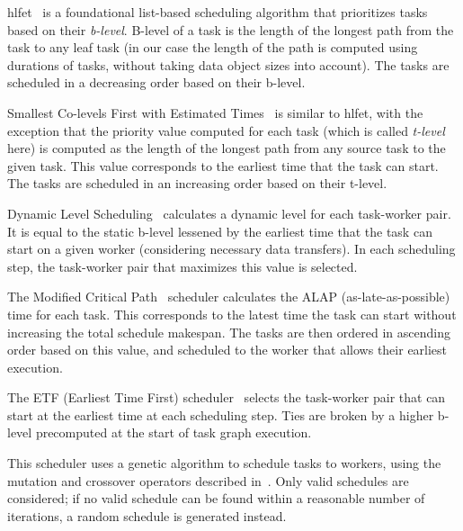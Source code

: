 \begin{description}[wide=0pt,itemsep=0pt,topsep=4pt]
	\item[blevel] \gls{hlfet}~\cite{hlfet1974} is a
		foundational list-based scheduling algorithm that prioritizes tasks based on their
		\emph{b-level}. B-level of a task is the length of the longest path from the task to any
		leaf task (in our case the length of the path is computed using durations of tasks, without taking
		data object sizes into account). The tasks are scheduled in a decreasing order based on their
		b-level.

	\item[tlevel]
		Smallest Co-levels First with Estimated Times~\cite{kwok1999static} is similar to
		\gls{hlfet}, with the exception that the priority value computed for each task (which is
		called \emph{t-level} here) is computed as the length of the longest path from any source
		task to the given task. This value corresponds to the earliest time that the task can start. The
		tasks are scheduled in an increasing order based on their t-level.

	\item[dls]
		Dynamic Level Scheduling~\cite{sih1993compile} calculates a dynamic level for each task-worker
		pair. It is equal to the static b-level lessened by the earliest time that the task can start on a
		given worker (considering necessary data transfers). In each scheduling step, the task-worker pair
		that maximizes this value is selected.

	\item[mcp]
		The Modified Critical Path~\cite{wu1990hypertool} scheduler calculates the ALAP
		(as-late-as-possible) time for each task. This corresponds to the latest time the task can start
		without increasing the total schedule makespan. The tasks are then ordered in ascending order based
		on this value, and scheduled to the worker that allows their earliest execution.

	\item[etf]
		The ETF (Earliest Time First) scheduler~\cite{hwang1989scheduling} selects the task-worker pair that
		can start at the earliest time at each scheduling step. Ties are broken by a higher b-level
		precomputed at the start of task graph execution.

	\item[genetic]
		This scheduler uses a genetic algorithm to schedule tasks to workers, using the mutation and
		crossover operators described in~\cite{omara2009genetic}. Only valid schedules are considered; if no
		valid schedule can be found within a reasonable number of iterations, a random schedule is
		generated instead.


\end{description}
